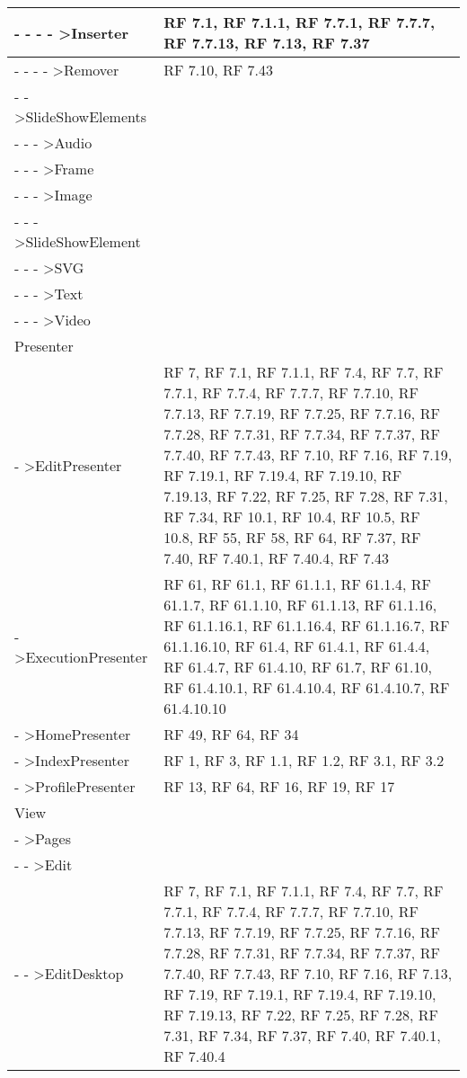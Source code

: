 {\begin{longtable} [c]{| p{8cm} | p{6cm} |}
- - - - >Inserter & RF 7.1, RF 7.1.1, RF 7.7.1, RF 7.7.7, RF 7.7.13, RF 7.13, RF 7.37\\ 
 \hline 
- - - - >Remover & RF 7.10, RF 7.43\\ 
 \hline 
- - >SlideShowElements & \\ 
 \hline 
- - - >Audio & \\ 
 \hline 
- - - >Frame & \\ 
 \hline 
- - - >Image & \\ 
 \hline 
- - - >SlideShowElement & \\ 
 \hline 
- - - >SVG & \\ 
 \hline 
- - - >Text & \\ 
 \hline 
- - - >Video & \\ 
 \hline 
Presenter & \\ 
 \hline 
- >EditPresenter & RF 7, RF 7.1, RF 7.1.1, RF 7.4, RF 7.7, RF 7.7.1, RF 7.7.4, RF 7.7.7, RF 7.7.10, RF 7.7.13, RF 7.7.19, RF 7.7.25, RF 7.7.16, RF 7.7.28, RF 7.7.31, RF 7.7.34, RF 7.7.37, RF 7.7.40, RF 7.7.43, RF 7.10, RF 7.16, RF 7.19, RF 7.19.1, RF 7.19.4, RF 7.19.10, RF 7.19.13, RF 7.22, RF 7.25, RF 7.28, RF 7.31, RF 7.34, RF 10.1, RF 10.4, RF 10.5, RF 10.8, RF 55, RF 58, RF 64, RF 7.37, RF 7.40, RF 7.40.1, RF 7.40.4, RF 7.43\\ 
 \hline 
- >ExecutionPresenter & RF 61, RF 61.1, RF 61.1.1, RF 61.1.4, RF 61.1.7, RF 61.1.10, RF 61.1.13, RF 61.1.16, RF 61.1.16.1, RF 61.1.16.4, RF 61.1.16.7, RF 61.1.16.10, RF 61.4, RF 61.4.1, RF 61.4.4, RF 61.4.7, RF 61.4.10, RF 61.7, RF 61.10, RF 61.4.10.1, RF 61.4.10.4, RF 61.4.10.7, RF 61.4.10.10\\ 
 \hline 
- >HomePresenter & RF 49, RF 64, RF 34\\ 
 \hline 
- >IndexPresenter & RF 1, RF 3, RF 1.1, RF 1.2, RF 3.1, RF 3.2\\ 
 \hline 
- >ProfilePresenter & RF 13, RF 64, RF 16, RF 19, RF 17\\ 
 \hline 
View & \\ 
 \hline 
- >Pages & \\ 
 \hline 
- - >Edit & \\ 
 \hline 
- - >EditDesktop & RF 7, RF 7.1, RF 7.1.1, RF 7.4, RF 7.7, RF 7.7.1, RF 7.7.4, RF 7.7.7, RF 7.7.10, RF 7.7.13, RF 7.7.19, RF 7.7.25, RF 7.7.16, RF 7.7.28, RF 7.7.31, RF 7.7.34, RF 7.7.37, RF 7.7.40, RF 7.7.43, RF 7.10, RF 7.16, RF 7.13, RF 7.19, RF 7.19.1, RF 7.19.4, RF 7.19.10, RF 7.19.13, RF 7.22, RF 7.25, RF 7.28, RF 7.31, RF 7.34, RF 7.37, RF 7.40, RF 7.40.1, RF 7.40.4\\ 

\end{longtable}}
